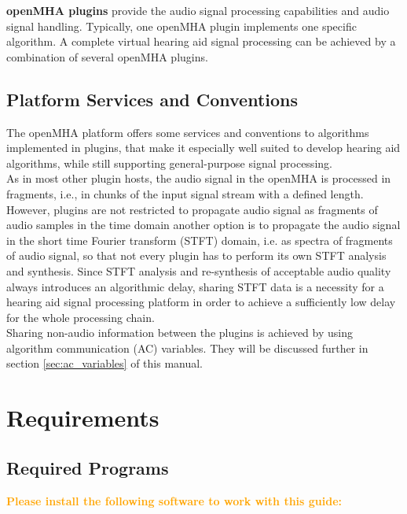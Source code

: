 \documentclass[11pt,a4paper,twoside]{article}
\newcommand{\+}{\discretionary{\mbox{\scriptsize$\hookleftarrow$}}{}{}}
\begin{document}
{\bf openMHA plugins} provide the audio signal processing capabilities
and audio signal handling. Typically, one openMHA plugin implements
one specific algorithm. A complete virtual hearing aid signal
processing can be achieved by a combination of several openMHA
plugins.
\subsection{Platform Services and Conventions}\label{index_pltf}
The openMHA platform offers some services and conventions to
algorithms implemented in plugins, that make it especially well suited
to develop hearing aid algorithms, while still supporting
general-purpose signal processing.\\ As in most other plugin hosts,
the audio signal in the openMHA is processed in fragments, i.e., in
chunks of the input signal stream with a defined length. However,
plugins are not restricted to propagate audio signal as fragments of
audio samples in the time domain another option is to propagate the
audio signal in the short time Fourier transform (STFT) domain,
i.e. as spectra of fragments of audio signal, so that not every plugin
has to perform its own STFT analysis and synthesis. Since STFT
analysis and re-synthesis of acceptable audio quality always
introduces an algorithmic delay, sharing STFT data is a necessity for
a hearing aid signal processing platform in order to achieve a
sufficiently low delay for the whole processing chain.\\ Sharing
non-audio information between the plugins is achieved by using
algorithm communication (AC) variables. They will be discussed further
in section \ref{sec:ac_variables} of this manual.



\section{Requirements}
\subsection{Required Programs}
\label{subsec:required_prog}

\textcolor{orange}{\textbf{Please install the following software to work with this guide:}}
\end{document}
